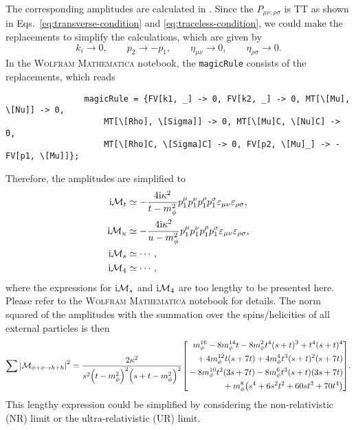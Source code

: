 \documentclass{article}
\begin{document}
            The corresponding amplitudes are calculated in .
            Since the $P_{\mu\nu, \rho\sigma}$ is TT as shown in Eqs.~\eqref{eq:transverse-condition} and \eqref{eq:traceless-condition}, we could make the replacements to simplify the calculations, which are given by
            \begin{equation}
                k_i \to 0, \qquad p_2 \to -p_1, \qquad \eta_{\mu\nu} \to 0, \qquad \eta_{\rho\sigma} \to 0.
            \end{equation}
            In the \textsc{Wolfram Mathematica} notebook, the \texttt{magicRule} consists of the replacements, which reads
            \begin{verbatim}
                magicRule = {FV[k1, _] -> 0, FV[k2, _] -> 0, MT[\[Mu], \[Nu]] -> 0, 
                    MT[\[Rho], \[Sigma]] -> 0, MT[\[Mu]C, \[Nu]C] -> 0, 
                    MT[\[Rho]C, \[Sigma]C] -> 0, FV[p2, \[Mu]_] -> -FV[p1, \[Mu]]};
            \end{verbatim}
            Therefore, the amplitudes are simplified to
            \begin{align}
                \iM[t] & \simeq -\frac{4 \ii \kappa^2}{t - m_\phi^2} p_1^\mu p_1^\nu p_1^\rho p_1^\sigma \varepsilon_{\mu\nu} \varepsilon_{\rho\sigma}, \\
                \iM[u] & \simeq -\frac{4 \ii \kappa^2}{u - m_\phi^2} p_1^\mu p_1^\nu p_1^\rho p_1^\sigma \varepsilon_{\mu\nu} \varepsilon_{\rho\sigma}, \\
                \iM[s] & \simeq \cdots, \\
                \iM[4] & \simeq \cdots,
            \end{align}
            where the expressions for $\iM[s]$ and $\iM[4]$ are too lengthy to be presented here.
            Please refer to the \textsc{Wolfram Mathematica} notebook for details.
            The norm squared of the amplitudes with the summation over the spins/helicities of all external particles is then
            \begin{equation}
                \sumMsqr[\phi + \phi \to h + h] = \frac{2 \kappa^2}{s^2 \qty(t - m_\phi^2)^2 \qty(s + t - m_\phi^2)^2} \qty[
                    \begin{aligned}
                        m_\phi^{16} - 8 m_\phi^{14} t - 8 m_\phi^2 t^4 (s + t)^3 + t^4 (s + t)^4 \\
                        {} + 4 m_\phi^{12} t (s + 7 t) + 4 m_\phi^4 t^3 (s + t)^2 (s + 7 t) \\
                        {} - 8 m_\phi^{10} t^2 (3 s + 7 t) - 8 m_\phi^6 t^3 (s + t) (3 s + 7 t) \\
                        {} + m_\phi^8 \qty(s^4 + 6 s^2 t^2 + 60 s t^3 + 70 t^4)
                    \end{aligned}
                ].
            \end{equation}
            This lengthy expression could be simplified by considering the non-relativistic (NR) limit or the ultra-relativistic (UR) limit.
\end{document}
